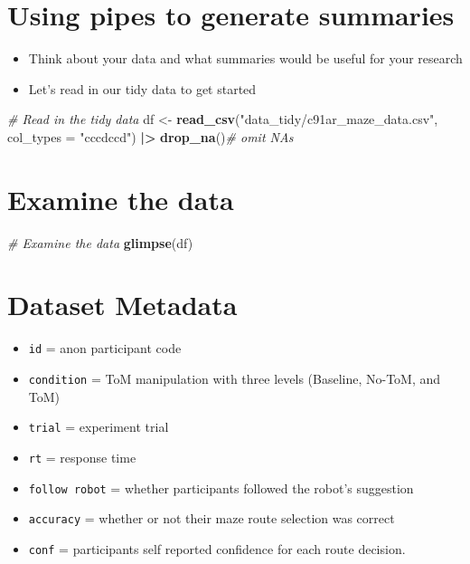 \documentclass[
]{article}
\newenvironment{Shaded}{\begin{snugshade}}{\end{snugshade}}
\newcommand{\AttributeTok}[1]{\textcolor[rgb]{0.13,0.29,0.53}{#1}}
\newcommand{\CommentTok}[1]{\textcolor[rgb]{0.56,0.35,0.01}{\textit{#1}}}
\newcommand{\FunctionTok}[1]{\textcolor[rgb]{0.13,0.29,0.53}{\textbf{#1}}}
\newcommand{\NormalTok}[1]{#1}
\newcommand{\OtherTok}[1]{\textcolor[rgb]{0.56,0.35,0.01}{#1}}
\newcommand{\SpecialCharTok}[1]{\textcolor[rgb]{0.81,0.36,0.00}{\textbf{#1}}}
\newcommand{\StringTok}[1]{\textcolor[rgb]{0.31,0.60,0.02}{#1}}
\providecommand{\tightlist}{%
  \setlength{\itemsep}{0pt}\setlength{\parskip}{0pt}}
\begin{document}
\hypertarget{using-pipes-to-generate-summaries}{%
\section{Using pipes to generate
summaries}\label{using-pipes-to-generate-summaries}}

\begin{itemize}
\tightlist
\item
  Think about your data and what summaries would be useful for your
  research
\item
  Let's read in our tidy data to get started
\end{itemize}

\begin{Shaded}
\begin{Highlighting}[]
\CommentTok{\# Read in the tidy data}
\NormalTok{df }\OtherTok{\textless{}{-}}
  \FunctionTok{read\_csv}\NormalTok{(}\StringTok{"data\_tidy/c91ar\_maze\_data.csv"}\NormalTok{,}
           \AttributeTok{col\_types =} \StringTok{"cccdccd"}\NormalTok{) }\SpecialCharTok{|\textgreater{}}
  \FunctionTok{drop\_na}\NormalTok{()}\CommentTok{\# omit NAs}
\end{Highlighting}
\end{Shaded}

\hypertarget{examine-the-data}{%
\section{Examine the data}\label{examine-the-data}}

\begin{Shaded}
\begin{Highlighting}[]
\CommentTok{\# Examine the data}
\FunctionTok{glimpse}\NormalTok{(df)}
\end{Highlighting}
\end{Shaded}

\hypertarget{dataset-metadata}{%
\section{Dataset Metadata}\label{dataset-metadata}}

\begin{itemize}
\tightlist
\item
  \texttt{id} = anon participant code
\item
  \texttt{condition} = ToM manipulation with three levels (Baseline,
  No-ToM, and ToM)
\item
  \texttt{trial} = experiment trial
\item
  \texttt{rt} = response time
\item
  \texttt{follow\ robot} = whether participants followed the robot's
  suggestion
\item
  \texttt{accuracy} = whether or not their maze route selection was
  correct
\item
  \texttt{conf} = participants self reported confidence for each route
  decision.
\end{itemize}
\end{document}
